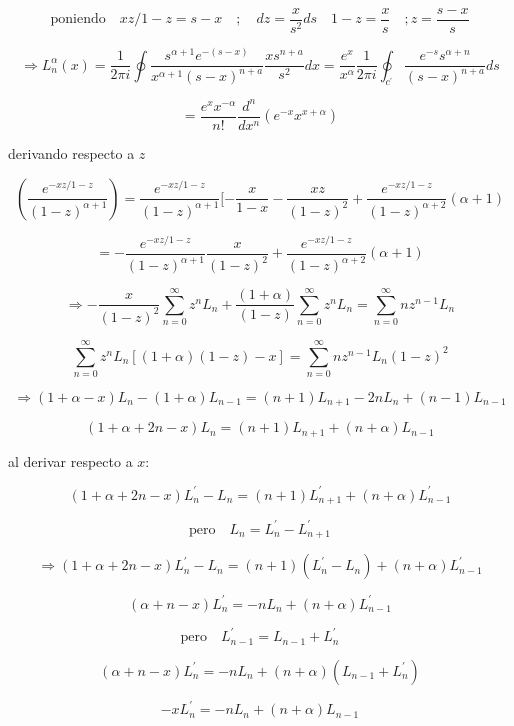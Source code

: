\documentclass{report}
\begin{document}
\[\text{poniendo} \quad xz/1-z  = s-x \quad ; \quad dz = \frac{x}{s^2 }  ds \quad 1-z = \frac{x}{s} \quad ; z = \frac{s-x}{s}\]

\[\Rightarrow L_{n}^{\alpha} (x) = \frac{1}{2 \pi i } \oint \frac{s^{\alpha +1} e^{-(s-x)}}{x^{\alpha + 1}(s-x)^{n+a} } \frac{xs^{n+a}}{s^2 } dx = \frac{e^x }{x^{\alpha}} \frac{1}{2 \pi i} \oint _{c^{\prime}} \frac{e^{-s} s^{\alpha +n}}{(s-x)^{n+a}} ds \]

\[= \frac{e^x x^{-\alpha}}{n!} \frac{d^n}{dx^n } (e^{-x} x^{x+ \alpha })\]

derivando respecto a $z$

\[(\frac{e^{-xz/1-z}}{(1-z)^{\alpha + 1}}) = \frac{e^{-xz/1-z}}{(1-z)^{\alpha + 1}} [- \frac{x}{1-x} - \frac{xz}{(1-z)^2 } + \frac{e^{-xz/1-z}}{(1-z)^{\alpha + 2}} (\alpha + 1)\]

\[= - \frac{e^{-xz/1-z}}{(1-z)^{\alpha + 1}} \frac{x}{(1-z)^2} + \frac{e^{-xz/1-z}}{(1-z)^{\alpha + 2}} (\alpha + 1)\]

\[\Rightarrow - \frac{x}{(1-z)^2} \sum_{n=0}^{\infty} z^n L_n + \frac{(1+ \alpha)}{(1-z)} \sum_{n=0}^{\infty} z^n L_n = \sum _{n=0}^{\infty} n z^{n-1}L_{n} \]

\[\sum_{n = 0} ^{\infty } z^n L_n [(1+ \alpha ) (1-z) - x] = \sum_{n = 0}^{\infty } n z ^{n-1} L_n (1 - z)^2 \]

\[\Rightarrow (1 + \alpha - x) L_n - (1 + \alpha )L_{n-1}  = (n + 1 )L_{n+1} - 2 n L_n + (n-1) L_{n-1} \]

\begin{equation}
(1 + \alpha + 2n - x) L_n = (n+1) L_{n+1} + (n+ \alpha ) L_{n-1 }
\end{equation}

al derivar respecto a $x$: 

\[(1+\alpha + 2n - x) L_{n}^{\prime } - L_n = (n+1) L_{n+1}^{\prime} + (n + \alpha ) L_{n-1}^{\prime }\]

\[\text{pero} \quad L_n = L_{n}^{\prime } -L_{n + 1}^{\prime }\]

\[\Rightarrow (1 + \alpha + 2n - x) L_{n}^{\prime } - L_n = (n+1 ) (L_{n}^{\prime } - L_n ) + (n + \alpha ) L_{n-1}^{\prime }\]

\[(\alpha + n - x) L_{n}^{\prime } = - n L_n + (n + \alpha ) L_{n-1}^{\prime}\]

\[\text{pero} \quad L_{n-1}^{\prime } = L_{n-1}	+ L_{n}^{\prime } \]

\[(\alpha + n - x) L_{n}^{\prime} = -n L_n + (n + \alpha ) (L_{n-1} + L_{n}^{\prime })\]

\[- x L_{n}^{\prime} = -n L_n + (n+ \alpha ) L_{n-1 }\]
\end{document}
